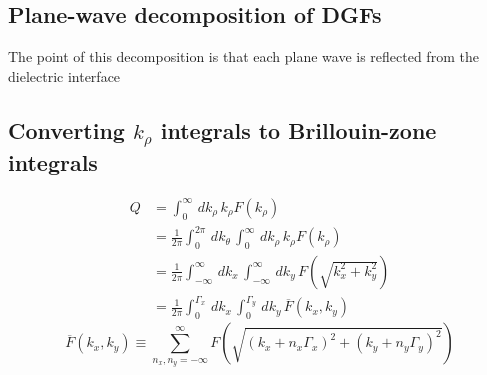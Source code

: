 \documentclass[letterpaper]{article}
\begin{document}
\subsection*{Plane-wave decomposition of DGFs}

The point of this decomposition is that each
plane wave is reflected from the dielectric interface

\subsection*{Converting $k_\rho$ integrals to Brillouin-zone integrals}

\begin{align*}
 Q &= \int_0^\infty \, dk_\rho \, k_\rho F(k_\rho) 
\\
   &= \frac{1}{2\pi} \int_0^{2\pi} \, dk_\theta \,
                     \int_0^\infty \, dk_\rho\, k_\rho F(k_\rho)  \,
\\
   &= \frac{1}{2\pi} \int_{-\infty}^{\infty} \, dk_x \,
                     \int_{-\infty}^{\infty} \, dk_y \,
                     F\left(\sqrt{k_x^2 + k_y^2}\right)
\\
   &= \frac{1}{2\pi} \int_{0}^{\Gamma_x} \, dk_x \,
                     \int_{0}^{\Gamma_y} \, dk_y \,
                     \overline{F}(k_x, k_y)
\end{align*}
$$ \overline{F}(k_x, k_y)
   \equiv \sum_{n_x,n_y=-\infty}^\infty
          F\left(\sqrt{ (k_x + n_x\Gamma_x)^2 + (k_y + n_y\Gamma_y)^2}\right)
$$
\end{document}
